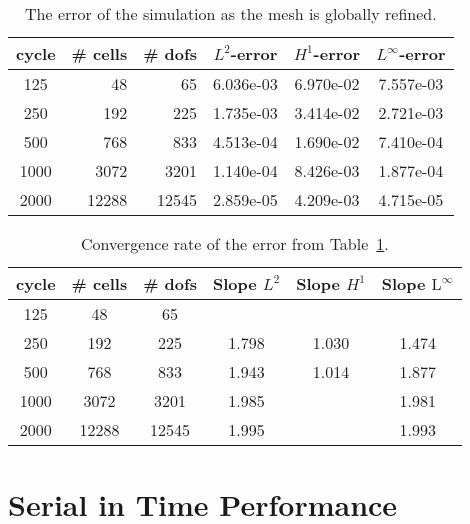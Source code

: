 \documentclass{article}
\begin{document}
\begin{table}\label{tbl:errorMFG}
  \begin{center}
    \begin{tabular}{|c|r|r|c|c|c|} \hline
      cycle & \# cells & \# dofs & $L^2$-error & $H^1$-error & $L^\infty$-error \\ \hline
      125 & 48 & 65 & 6.036e-03 & 6.970e-02 & 7.557e-03\\ \hline
      250 & 192 & 225 & 1.735e-03 & 3.414e-02 & 2.721e-03 \\ \hline
      500 & 768 & 833 & 4.513e-04 & 1.690e-02 & 7.410e-04 \\ \hline
      1000 & 3072 & 3201 & 1.140e-04 & 8.426e-03 & 1.877e-04 \\ \hline
      2000 & 12288 & 12545 & 2.859e-05 & 4.209e-03 & 4.715e-05 \\ \hline
    \end{tabular}
  \end{center}
  \caption{The error of the simulation as the mesh is globally refined.}
\end{table}

\begin{table}\label{tbl:convergenceRate}
  \begin{center}
    \begin{tabular}{|c|c|c|c|c|c|} \hline
      cycle & \# cells & \# dofs & Slope $L^2$ & Slope $H^1$  & Slope $\textrm{L}^\infty$ \\ \hline
      125 & 48 & 65 & & & \\ \hline
      250 & 192 & 225 & 1.798 & 1.030 & 1.474 \\ \hline
      500 & 768 & 833 & 1.943 & 1.014 & 1.877 \\ \hline
      1000 & 3072 & 3201 & 1.985 & & 1.981 \\ \hline
      2000 & 12288 & 12545 & 1.995 & & 1.993 \\ \hline
    \end{tabular}
  \end{center}
  \caption{Convergence rate of the error from Table~\ref{tbl:errorMFG}.}
\end{table}

\section{Serial in Time Performance}
\label{sec:SiTPerformance}
\end{document}
